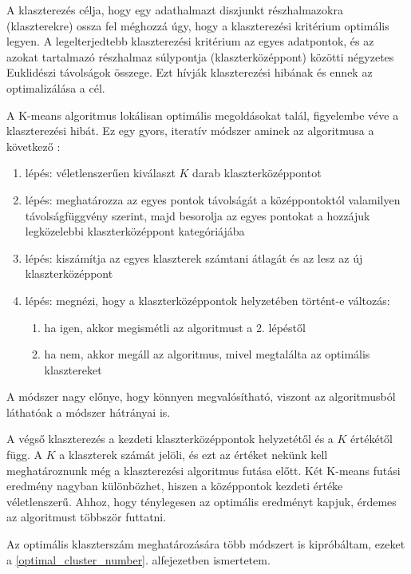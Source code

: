 A klaszterezés célja, hogy egy adathalmazt diszjunkt részhalmazokra (klaszterekre) ossza fel méghozzá úgy, hogy a klaszterezési kritérium optimális legyen. A legelterjedtebb klaszterezési kritérium az egyes adatpontok, és az azokat tartalmazó részhalmaz súlypontja (klaszterközéppont) közötti négyzetes Euklidészi távolságok összege. Ezt hívják klaszterezési hibának és ennek az optimalizálása a cél. \cite{kmeans}

A K-means algoritmus lokálisan optimális megoldásokat talál, figyelembe véve a klaszterezési hibát. Ez egy gyors, iteratív módszer aminek az algoritmusa a következő \cite{tomatoleaf}:
\begin{enumerate}
\item lépés: véletlenszerűen kiválaszt $K$ darab klaszterközéppontot
\item lépés: meghatározza az egyes pontok távolságát a középpontoktól valamilyen távolságfüggvény szerint, majd besorolja az egyes pontokat a hozzájuk legközelebbi klaszterközéppont kategóriájába
\item lépés: kiszámítja az egyes klaszterek számtani átlagát és az lesz az új klaszterközéppont
\item lépés: megnézi, hogy a klaszterközéppontok helyzetében történt-e változás:
    \begin{enumerate}
    \item ha igen, akkor megismétli az algoritmust a 2. lépéstől
    \item ha nem, akkor megáll az algoritmus, mivel megtalálta az optimális klasztereket
    \end{enumerate}
\end{enumerate}

A módszer nagy előnye, hogy könnyen megvalósítható, viszont az algoritmusból láthatóak a módszer hátrányai is.

A végső klaszterezés a kezdeti klaszterközéppontok helyzetétől és a $K$ értékétől függ. A $K$ a klaszterek számát jelöli, és ezt az értéket nekünk kell meghatároznunk még a klaszterezési algoritmus futása előtt. Két K-means futási eredmény nagyban különbözhet, hiszen a középpontok kezdeti értéke véletlenszerű. Ahhoz, hogy ténylegesen az optimális eredményt kapjuk, érdemes az algoritmust többször futtatni.

Az optimális klaszterszám meghatározására több módszert is kipróbáltam, ezeket a \ref{optimal_cluster_number}. alfejezetben ismertetem.

